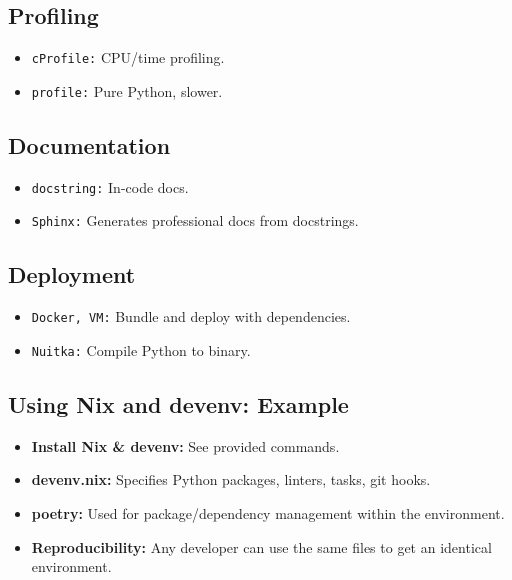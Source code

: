 \documentclass[11pt,a4paper]{article}
\begin{document}
\subsection*{Profiling}
\begin{itemize}
    \item \texttt{cProfile:} CPU/time profiling.
    \item \texttt{profile:} Pure Python, slower.
\end{itemize}

\subsection*{Documentation}
\begin{itemize}
    \item \texttt{docstring:} In-code docs.
    \item \texttt{Sphinx:} Generates professional docs from docstrings.
\end{itemize}

\subsection*{Deployment}
\begin{itemize}
    \item \texttt{Docker, VM:} Bundle and deploy with dependencies.
    \item \texttt{Nuitka:} Compile Python to binary.
\end{itemize}

\subsection*{Using Nix and devenv: Example}
\begin{itemize}
    \item \textbf{Install Nix \& devenv:} See provided commands.
    \item \textbf{devenv.nix:} Specifies Python packages, linters, tasks, git hooks.
    \item \textbf{poetry:} Used for package/dependency management within the environment.
    \item \textbf{Reproducibility:} Any developer can use the same files to get an identical environment.
\end{itemize}
\end{document}
